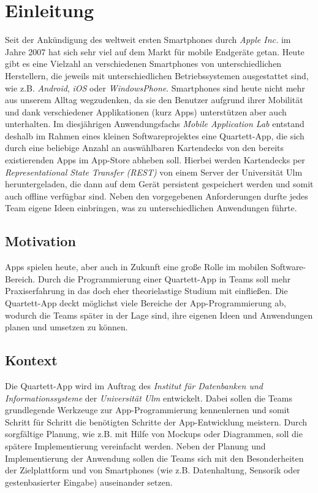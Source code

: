 \chapter{Einleitung}
\label{cha:einleitung}

Seit der Ankündigung des weltweit ersten Smartphones durch \textit{Apple Inc.} im Jahre 2007 hat sich sehr viel auf dem Markt für mobile Endgeräte getan. Heute gibt es eine Vielzahl an verschiedenen Smartphones von unterschiedlichen Herstellern, die jeweils mit unterschiedlichen Betriebssystemen ausgestattet sind, wie z.B. \textit{Android}, \textit{iOS} oder \textit{WindowsPhone}. Smartphones sind heute nicht mehr aus unserem Alltag wegzudenken, da sie den Benutzer aufgrund ihrer Mobilität und dank verschiedener Applikationen (kurz \glqq Apps\grqq) unterstützen aber auch unterhalten. Im diesjährigen Anwendungsfachs \textit{Mobile Application Lab} entstand deshalb im Rahmen eines kleinen Softwareprojektes eine Quartett-App, die sich durch eine beliebige Anzahl an auswählbaren Kartendecks von den bereits existierenden Apps im App-Store abheben soll. Hierbei werden Kartendecks per \textit{Representational State Transfer (REST)} von einem Server der Universität Ulm heruntergeladen, die dann auf dem Gerät persistent gespeichert werden und somit auch offline verfügbar sind. Neben den vorgegebenen Anforderungen durfte jedes Team eigene Ideen einbringen, was zu unterschiedlichen Anwendungen führte.

\section{Motivation}
\label{sec:motivation}

Apps spielen heute, aber auch in Zukunft eine große Rolle im mobilen Software-Bereich. Durch die Programmierung einer Quartett-App in Teams soll mehr Praxiserfahrung in das doch eher theorielastige Studium mit einfließen. Die Quartett-App deckt möglichst viele Bereiche der App-Programmierung ab, wodurch die Teams später in der Lage sind, ihre eigenen Ideen und Anwendungen planen und umsetzen zu können.

\section{Kontext}
\label{sec:kontext}

Die Quartett-App wird im Auftrag des \textit{Institut für Datenbanken und Informationssysteme} der \textit{Universität Ulm} entwickelt. Dabei sollen die Teams grundlegende Werkzeuge zur App-Programmierung kennenlernen und somit Schritt für Schritt die benötigten Schritte der App-Entwicklung meistern. Durch sorgfältige Planung, wie z.B. mit Hilfe von Mockups oder Diagrammen, soll die spätere Implementierung vereinfacht werden. Neben der Planung und Implementierung der Anwendung sollen die Teams sich mit den Besonderheiten der Zielplattform und von Smartphones (wie z.B. Datenhaltung, Sensorik oder gestenbasierter Eingabe) auseinander setzen.



